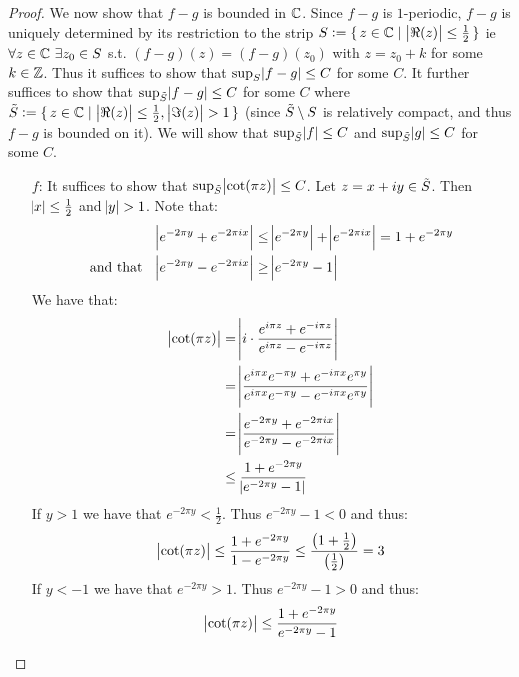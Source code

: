 \begin{proof}
We now show that $f-g$ is bounded in $\mathbb{C}$. Since $f-g$ is $1$-periodic, $f-g$ is uniquely determined by its restriction to the strip $S \vcentcolon = \set{z \in \mathbb{C}\mid \, \abs{\Re(z)} \leq \frac{1}{2}}$ ie $\forall z \in \mathbb{C} \, \, \exists z_0 \in S$ s.t. $(f-g)(z) = (f-g)(z_0)$ with $z = z_0 + k$ for some $k \in \mathbb{Z}$. Thus it suffices to show that $\sup_{S} \abs{f-g} \leq C $ for some $C$. It further suffices to show that $\sup_{\Tilde{S}} \abs{f-g} \leq C $ for some $C$ where $\Tilde{S} \vcentcolon = \set{z \in \mathbb{C}\mid \, \abs{\Re(z)} \leq \frac{1}{2}, \, \abs{\Im (z)} >1 }$ (since $\Tilde{S} \setminus S$ is relatively compact, and thus $f-g$ is bounded on it). We will show that $\sup_{\Tilde{S}} \abs{f} \leq C $ and $\sup_{\Tilde{S}} \abs{g} \leq C $ for some $C$.\\

\begin{enumerate}
    \item[$f$:] It suffices to show that $\sup_{\Tilde{S}} \abs{\cot(\pi z)} \leq C $. Let $z = x+iy \in \Tilde{S}$. Then $\abs{x} \leq \frac{1}{2}$ and $\abs{y} > 1$. Note that:
    \begin{align*}
        \abs{e^{-2 \pi y} + e^{-2 \pi i x}} &\leq \abs{e^{-2 \pi y} } + \abs{ e^{-2 \pi i x}} = 1+e^{-2 \pi y} \\
        \text{and that } \;\; \abs{e^{-2 \pi y} - e^{-2 \pi i x}} &\geq \abs{e^{-2\pi y} -1}
    \end{align*}
    We have that:
    \begin{align*}
        \abs{\cot(\pi z)} &= \abs{i \cdot  \frac{e^{i \pi z} + e^{-i \pi z}}{e^{i \pi z} - e^{-i \pi z}}}\\
        &= \abs{\frac{e^{i \pi x} e^{- \pi y} + e^{-i \pi x} e^{\pi y}}{e^{i \pi x}e^{-\pi y} - e^{-i \pi x} e^{\pi y}}}\\
        &= \abs{ \frac{ e^{-2 \pi y} + e^{-2 \pi i x} }{ e^{-2 \pi y} - e^{ - 2 \pi i x}}}\\
        &\leq \frac{1+e^{-2 \pi y}}{\abs{e^{-2\pi y} -1}}
    \end{align*}
    If $y>1$ we have that $e^{-2 \pi y} < \frac{1}{2}$. Thus $e^{-2\pi y} -1 < 0$ and thus:
    \begin{align*}
        \abs{\cot(\pi z)} \leq \frac{1+e^{-2 \pi y}}{1-e^{-2\pi y}} \leq \frac{\left( 1+\frac{1}{2}  \right)}{\left( \frac{1}{2} \right)} = 3
    \end{align*}
    If $y<-1$ we have that $e^{-2 \pi y} > 1$. Thus $e^{-2\pi y} -1 > 0$ and thus:
    \begin{align*}
        \abs{\cot(\pi z)} \leq \frac{1+e^{-2 \pi y}}{e^{-2\pi y} - 1} 

\end{align*}
\end{enumerate}
\end{proof}
